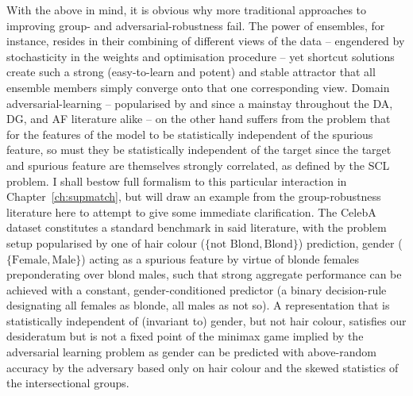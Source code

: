 With the above in mind, it is obvious why more traditional approaches to improving group- and
adversarial-robustness fail. 
%
The power of ensembles, for instance, resides in their combining of different views of the data --
engendered by stochasticity in the weights and optimisation procedure -- yet shortcut solutions
create such a strong (easy-to-learn and potent) and stable attractor that all ensemble
members simply converge onto that one corresponding view.
%
Domain adversarial-learning -- popularised by \citet{ganin2016domain} and since a mainstay throughout the
\ac{DA}, \ac{DG}, and \ac{AF} literature alike -- on the other hand suffers from the problem that
for the features of the model to be statistically independent of the spurious feature, so must they
be statistically independent of the target since the target and spurious feature are themselves
strongly correlated, as defined by the \ac{SCL} problem.
%
I shall bestow full formalism to this particular interaction in Chapter~\ref{ch:supmatch}, but will
draw an example from the group-robustness literature here to attempt to give some immediate
clarification.
%
The CelebA dataset constitutes a standard benchmark in said literature, with the problem setup
popularised by \citet{sagawa2019distributionally} one of hair colour (\( \{ \text{not Blond},
\text{Blond} \} \)) prediction, gender (\( \{ \text{Female}, \text{Male} \} \)) acting as a
spurious feature by virtue of blonde females preponderating over blond males, such that strong
aggregate performance can be achieved with a constant, gender-conditioned predictor (a binary
decision-rule designating all females as blonde, all males as not so).
%
A representation that is statistically independent of (invariant to) gender, but not hair colour,
satisfies our desideratum but is not a fixed point of the minimax game implied by the adversarial
learning problem as gender can be predicted with above-random accuracy by the adversary based only
on hair colour and the skewed statistics of the intersectional groups.
%
